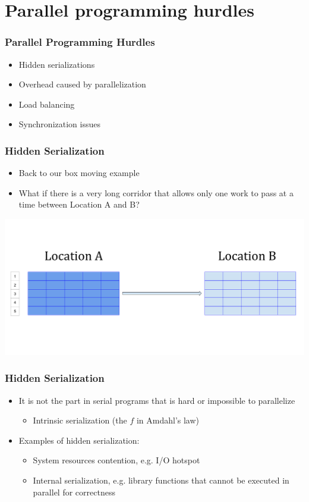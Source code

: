 \documentclass[10pt,t]{beamer}
\begin{document}
\section{Parallel programming hurdles}
\begin{frame}
\frametitle{Parallel Programming Hurdles}
\begin{itemize}
\item Hidden serializations
\item Overhead caused by parallelization
\item Load balancing
\item Synchronization issues
\end{itemize}
\end{frame}

\begin{frame}
\frametitle{Hidden Serialization}
\begin{itemize}
\item Back to our box moving example
\item What if there is a very long corridor that allows only one work to pass at a time between Location A and B?
\end{itemize}
\includegraphics[width=\textwidth]{./Parallel_Load}
\end{frame}

\begin{frame}
\frametitle{Hidden Serialization}
\begin{itemize}
\item It is not the part in serial programs that is hard or impossible to parallelize
\begin{itemize}
\item Intrinsic serialization (the $f$ in Amdahl's law)
\end{itemize}
\item Examples of hidden serialization:
\begin{itemize}
\item System resources contention, e.g. I/O hotspot
\item Internal serialization, e.g. library functions that cannot be executed in parallel for correctness
\end{itemize}
\end{itemize}
\end{frame}
\end{document}
